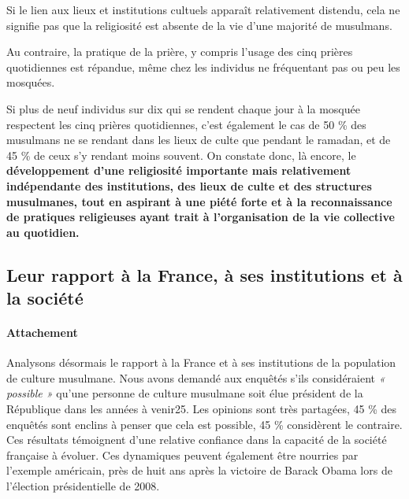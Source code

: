 Si le lien aux lieux et institutions cultuels apparaît relativement
distendu, cela ne signifie pas que la religiosité est absente de la vie
d'une majorité de musulmans.

Au contraire, la pratique de la prière, y compris l'usage des cinq
prières quotidiennes est répandue, même chez les individus ne
fréquentant pas ou peu les mosquées.

Si plus de neuf individus sur dix qui se rendent chaque jour à la
mosquée respectent les cinq prières quotidiennes, c'est également le cas
de 50 \% des musulmans ne se rendant dans les lieux de culte que pendant
le ramadan, et de 45 \% de ceux s'y rendant moins souvent. On constate
donc, là encore, le \textbf{développement d'une religiosité importante
mais relativement indépendante des institutions, des lieux de culte et
des structures musulmanes, tout en aspirant à une piété forte et à la
reconnaissance de pratiques religieuses ayant trait à l'organisation de
la vie collective au quotidien.}




  \subsection{Leur rapport à la France, à ses institutions et à la société}
  
  
    \paragraph{Attachement}



Analysons désormais le rapport à la France et à ses institutions de la
population de culture musulmane. Nous avons demandé aux enquêtés s'ils
considéraient \emph{« possible »} qu'une personne de culture musulmane soit élue
président de la République dans les années à venir25. Les opinions sont
très partagées, 45 \% des enquêtés sont enclins à penser que cela est
possible, 45 \% considèrent le contraire. Ces résultats témoignent d'une
relative confiance dans la capacité de la société française à évoluer.
Ces dynamiques peuvent également être nourries par l'exemple américain,
près de huit ans après la victoire de Barack Obama lors de l'élection
présidentielle de 2008.

